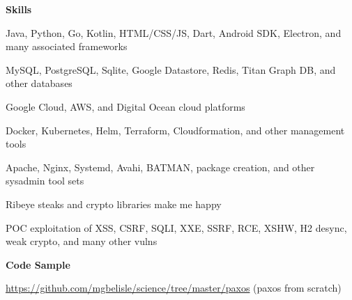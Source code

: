 \documentclass[10pt, a4paper]{article}
\begin{document}
\textbf{Skills}
\begin{itemize*}
  \item Java, Python, Go, Kotlin, HTML/CSS/JS, Dart, Android SDK, Electron, and many associated frameworks
  \item MySQL, PostgreSQL, Sqlite, Google Datastore, Redis, Titan Graph DB, and other databases
  \item Google Cloud, AWS, and Digital Ocean cloud platforms
  \item Docker, Kubernetes, Helm, Terraform, Cloudformation, and other management tools
  \item Apache, Nginx, Systemd, Avahi, BATMAN, package creation, and other sysadmin tool sets
  \item Ribeye steaks and crypto libraries make me happy
  \item POC exploitation of XSS, CSRF, SQLI, XXE, SSRF, RCE, XSHW, H2 desync, weak crypto, and many other vulns
\end{itemize*}
\textbf{Code Sample}

\url{https://github.com/mgbelisle/science/tree/master/paxos} (paxos from scratch)
\end{document}
